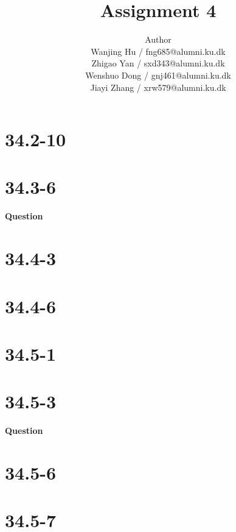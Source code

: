 \documentclass[12pt]{article}
\title{Assignment 4}
\author{Author \\
  Wanjing Hu / fng685@alumni.ku.dk  \\
  Zhigao Yan / sxd343@alumni.ku.dk  \\
  Wenshuo Dong / gnj461@alumni.ku.dk  \\
  Jiayi Zhang / xrw579@alumni.ku.dk \\
}
\begin{document}
\maketitle

\section{34.2-10}

\section{34.3-6}
\textbf{Question}

\section{34.4-3}

\section{34.4-6}

\section{34.5-1}

\section{34.5-3}
\textbf{Question}

\section{34.5-6}

\section{34.5-7}
\end{document}

